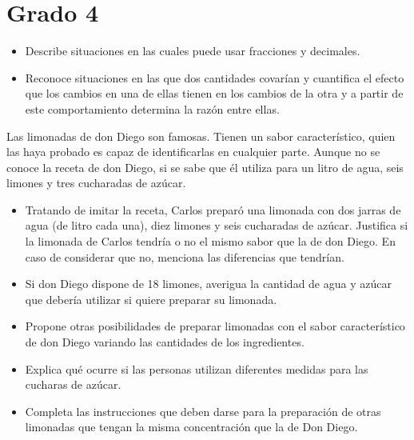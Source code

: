 \section{Grado 4}\label{grado:4}


\evidencias

\begin{itemize}
  \item Describe situaciones en las cuales puede usar fracciones y decimales.
  \item Reconoce situaciones en las que dos cantidades covarían y cuantifica el efecto que los cambios en una de ellas tienen en los cambios de la otra y a partir de este comportamiento determina la razón entre ellas.
\end{itemize}

\ejemplo

Las limonadas de don Diego son famosas. Tienen un sabor característico, quien las haya probado es capaz de identificarlas en cualquier parte. Aunque no se conoce la receta de don Diego, si se sabe que él utiliza para un litro de agua, seis limones y tres cucharadas de azúcar.


\begin{itemize}
  \item Tratando de imitar la receta, Carlos preparó una limonada con dos jarras de agua (de litro cada una), diez limones y seis cucharadas de azúcar. Justifica si la limonada de Carlos tendría o no el mismo sabor que la de don Diego. En caso de considerar que no, menciona las diferencias que tendrían.
  \item Si don Diego dispone de 18 limones, averigua la cantidad de agua y azúcar que debería utilizar si quiere preparar su limonada.
  \item Propone otras posibilidades de preparar limonadas con el sabor característico de don Diego variando las cantidades de los ingredientes.
  \item Explica qué ocurre si las personas utilizan diferentes medidas para las cucharas de azúcar.
  \item Completa las instrucciones que deben darse para la preparación de otras limonadas que tengan la misma concentración que la de Don Diego.
\end{itemize}

